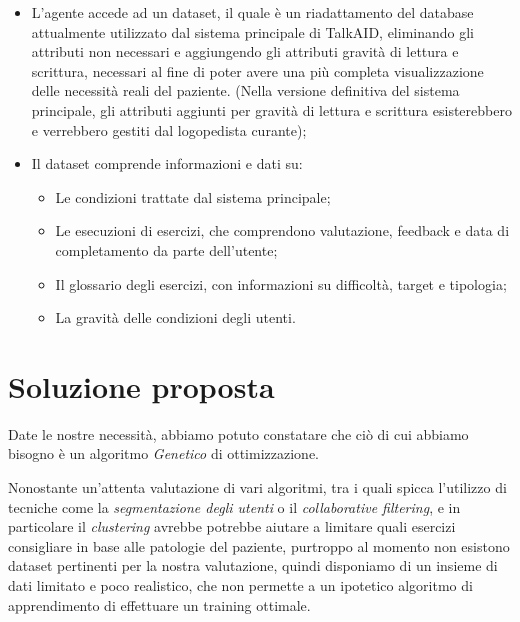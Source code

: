 \documentclass{article}
\begin{document}
    \begin{itemize}
        \item L'agente accede ad un dataset, il quale è un riadattamento del database attualmente utilizzato dal sistema principale di TalkAID, eliminando gli attributi non necessari e aggiungendo gli attributi gravità di lettura e scrittura, necessari al fine di poter avere una più completa visualizzazione delle necessità reali del paziente. (Nella versione definitiva del sistema principale, gli attributi aggiunti per gravità di lettura e scrittura esisterebbero e verrebbero gestiti dal logopedista curante);

        \item Il dataset comprende informazioni e dati su:
            \begin{itemize}
                \item Le condizioni trattate dal sistema principale;
                \item Le esecuzioni di esercizi, che comprendono valutazione, feedback e data di completamento da parte dell'utente;
                \item Il glossario degli esercizi, con informazioni su difficoltà, target e tipologia;
                \item La gravità delle condizioni degli utenti.
            \end{itemize}



    \end{itemize}

    \pagebreak

    \section{Soluzione proposta}

    Date le nostre necessità, abbiamo potuto constatare che ciò di cui abbiamo bisogno è un algoritmo \textit{Genetico} di ottimizzazione.

    Nonostante un'attenta valutazione di vari algoritmi, tra i quali spicca l'utilizzo di tecniche come la \textit{segmentazione degli utenti} o il \textit{collaborative filtering}, e in particolare il \textit{clustering} avrebbe potrebbe aiutare a limitare quali esercizi consigliare in base alle patologie del paziente, purtroppo al momento non esistono dataset pertinenti per la nostra valutazione, quindi disponiamo di un insieme di dati limitato e poco realistico, che non permette a un ipotetico algoritmo di apprendimento di effettuare un training ottimale.
\end{document}
